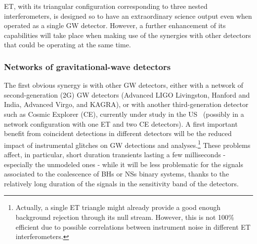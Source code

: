 ET, with its triangular configuration corresponding to three nested interferometers, is designed so to have an extraordinary science output even when operated as a single GW detector. However, a further enhancement of its capabilities will take place when making use of  the synergies with other detectors that could be operating at the same time.

\subsubsection{Networks of  gravitational-wave detectors}\label{sect:net3G}

The first obvious synergy is with other GW detectors, either with a network of second-generation (2G) GW detectors (Advanced LIGO Livingston, Hanford and India, Advanced Virgo, and KAGRA),  
or with another
third-generation detector such as  Cosmic Explorer (CE), currently under study in the US~\cite{Dwyer:2014fpa,Reitze:2019iox} (possibly in a network configuration with one ET and two CE detectors).   A first important benefit from coincident detections in different detectors
will be the reduced impact of instrumental glitches on GW detections and analyses.\footnote{Actually, a single ET triangle might already provide a good enough background rejection through its null stream. However,  this is not 100\% efficient due to possible correlations between instrument noise in different ET interferometers.}
These problems affect, in particular, short duration transients lasting a few milliseconds - especially the unmodeled ones - while it will be less problematic for the signals associated to the coalescence of BHs or NSs binary systems, thanks to the relatively long duration of the signals in the sensitivity band of the detectors.


